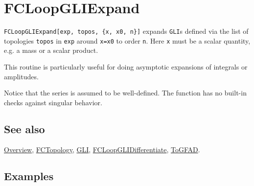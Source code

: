 \documentclass[../FeynCalcManual.tex]{subfiles}
\begin{document}
\hypertarget{fcloopgliexpand}{
\section{FCLoopGLIExpand}\label{fcloopgliexpand}}

\texttt{FCLoopGLIExpand[\allowbreak{}exp,\ \allowbreak{}topos,\ \allowbreak{}\{\allowbreak{}x,\ \allowbreak{}x0,\ \allowbreak{}n\}]}
expands \texttt{GLI}s defined via the list of topologies \texttt{topos}
in \texttt{exp} around \texttt{x=x0} to order \texttt{n}. Here
\texttt{x} must be a scalar quantity, e.g. a mass or a scalar product.

This routine is particularly useful for doing asymptotic expansions of
integrals or amplitudes.

Notice that the series is assumed to be well-defined. The function has
no built-in checks against singular behavior.

\subsection{See also}

\hyperlink{toc}{Overview}, \hyperlink{fctopology}{FCTopology},
\hyperlink{gli}{GLI},
\hyperlink{fcloopglidifferentiate}{FCLoopGLIDifferentiate},
\hyperlink{togfad}{ToGFAD}.

\subsection{Examples}

\begin{Shaded}
\begin{Highlighting}[]
\OperatorTok{[}\OperatorTok{[}\OperatorTok{,} \OperatorTok{\{}\OperatorTok{,} \OperatorTok{,} \OperatorTok{\}],} 
  \OperatorTok{\{}\OperatorTok{[}\OperatorTok{,} \OperatorTok{\{}\OperatorTok{[\{}\OperatorTok{,}\OperatorTok{\}],}\OperatorTok{[\{}\OperatorTok{,}\OperatorTok{\}],}\OperatorTok{[\{}\SpecialCharTok{{-}}\OperatorTok{,}\OperatorTok{\}]\},} 
    \OperatorTok{\{}\OperatorTok{,}\OperatorTok{\},} \OperatorTok{\{\},} \OperatorTok{\{\},} \OperatorTok{\{\}]\},} \OperatorTok{\{}\OperatorTok{,} \OperatorTok{,} \OperatorTok{\}]}
\end{Highlighting}
\end{Shaded}
\end{document}
